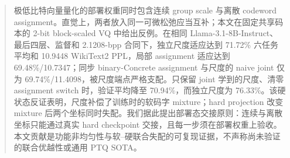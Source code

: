 \begin{abstract}
极低比特向量量化的部署权重同时包含连续 group scale 与离散 codeword assignment。直觉上，两者放入同一可微松弛应当互补；本文在固定共享码本的 2-bit block-scaled VQ 中给出反例。在相同 Llama-3.1-8B-Instruct、最后四层、监督和 2.1208-bpp 合同下，独立尺度适应达到 71.72\% 六任务平均和 10.9448 WikiText2 PPL，局部 assignment 适应达到 69.48\%/10.7347；同步 binary-Concrete assignment 与尺度的 naive joint 仅为 69.74\%/11.4098，被尺度端点严格支配。只保留 joint 学到的尺度、清零 assignment switch 时，验证平均降至 70.94\%，而独立尺度为 76.33\%。该硬状态反证表明，尺度补偿了训练时的软码字 mixture；hard projection 改变 mixture 后两个坐标同时失配。我们据此提出部署态交接原则：连续与离散坐标只能通过真实 hard checkpoint 交接，且每一步须在部署权重上验收。本文贡献是功能非均匀性与软--硬联合失配的可复现证据，不声称尚未验证的联合优越性或通用 PTQ SOTA。
\end{abstract}
